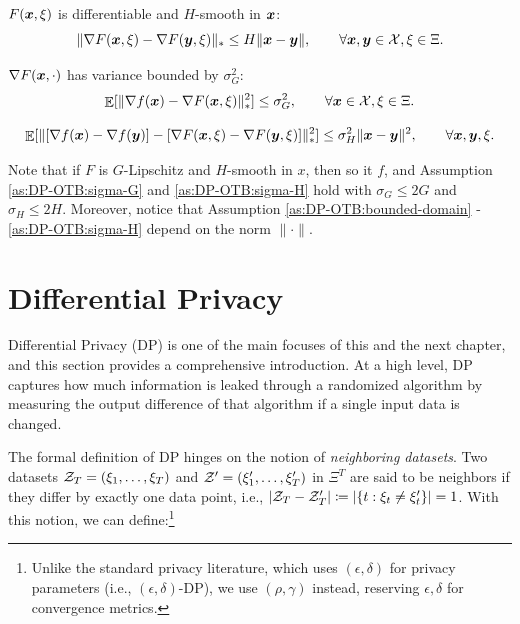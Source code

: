 \begin{assumption}[Smoothness]
\label{as:DP-OTB:smooth}
$F({\boldsymbol{x}},\xi)$ is differentiable and $H$-smooth in ${\boldsymbol{x}}$: 
\begin{equation}
    \|\nabla F({\boldsymbol{x}},\xi) - \nabla F({\boldsymbol{y}},\xi)\|_* \le H\|{\boldsymbol{x}} - {\boldsymbol{y}}\|,
    \qquad \forall {\boldsymbol{x}},{\boldsymbol{y}}\in{\cal X}, \xi\in\Xi.
\end{equation}
\end{assumption}

\begin{assumption}
\label{as:DP-OTB:sigma-G}
$\nabla F({\boldsymbol{x}},\cdot)$ has variance bounded by $\sigma_G^2$:
\begin{equation}
    \mathop{\mathbb{E}}[\|\nabla f({\boldsymbol{x}}) - \nabla F({\boldsymbol{x}},\xi)\|_\ast^2] \le \sigma_G^2,
    \qquad \forall {\boldsymbol{x}}\in{\cal X}, \xi\in\Xi.
\end{equation}
\end{assumption}

\begin{assumption}
\label{as:DP-OTB:sigma-H}
\begin{equation}
    \mathop{\mathbb{E}}[\|[\nabla f({\boldsymbol{x}})-\nabla f({\boldsymbol{y}})] - [\nabla F({\boldsymbol{x}},\xi)-\nabla F({\boldsymbol{y}},\xi)]\|_\ast^2] \leq \sigma_H^2\|{\boldsymbol{x}}-{\boldsymbol{y}}\|^2,
    \qquad \forall {\boldsymbol{x}},{\boldsymbol{y}},\xi.
\end{equation}
\end{assumption}

Note that if $F$ is $G$-Lipschitz and $H$-smooth in $x$, then so it $f$, and Assumption \ref{as:DP-OTB:sigma-G} and \ref{as:DP-OTB:sigma-H} hold with $\sigma_G\leq 2G$ and $\sigma_H\leq 2H$. Moreover, notice that Assumption \ref{as:DP-OTB:bounded-domain} - \ref{as:DP-OTB:sigma-H} depend on the norm $\|\cdot\|$. 


\section{Differential Privacy} 

Differential Privacy (DP) is one of the main focuses of this and the next chapter, and this section provides a comprehensive introduction. At a high level, DP captures how much information is leaked through a randomized algorithm by measuring the output difference of that algorithm if a single input data is changed.

The formal definition of DP hinges on the notion of \emph{neighboring datasets}. Two datasets ${\cal Z}_T=(\xi_1,\ldots,\xi_T)$ and ${\cal Z}'=(\xi_1',\ldots,\xi_T')$ in $\Xi^T$ are said to be neighbors if they differ by exactly one data point, i.e., $|{\cal Z}_T-{\cal Z}_T'| \coloneqq |\{t : \xi_t\ne \xi'_t\}| = 1$. With this notion, we can define:\footnote{Unlike the standard privacy literature, which uses $(\epsilon,\delta)$ for privacy parameters (i.e., $(\epsilon,\delta)$-DP), we use $(\rho,\gamma)$ instead, reserving $\epsilon,\delta$ for convergence metrics.}

